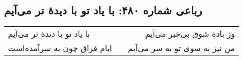 \begin{center}
\section*{رباعی شماره ۴۸۰: با یاد تو با دیدهٔ تر می‌آیم}
\label{sec:sh480}
\begin{longtable}{l p{0.5cm} r}
با یاد تو با دیدهٔ تر می‌آیم
&&
وز بادهٔ شوق بی‌خبر می‌آیم
\\
ایام فراق چون به سرآمده‌است
&&
من نیز به سوی تو به سر می‌آیم
\\
\end{longtable}
\end{center}
